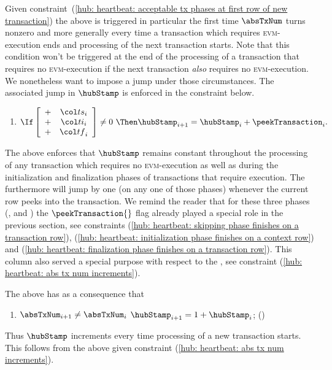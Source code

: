 \saNote{} Given constraint~(\ref{hub: heartbeat: acceptable tx phases at first row of new transaction}) the above is triggered in particular the first time $\absTxNum$ turns nonzero and more generally every time a transaction which requires \textsc{evm}-execution ends and processing of the next transaction starts. Note that this condition won't be triggered at the end of the processing of a transaction that requires no \textsc{evm}-execution if the next transaction \emph{also} requires no \textsc{evm}-execution.
We nonetheless want to impose a jump under those circumstances.
The associated jump in $\hubStamp$ is enforced in the constraint below.
\begin{enumerate}[resume]
	\item
		\[
			\If
			\left[ \begin{array}{cccc}
				+ & \ts_{i} \\
				+ & \ti_{i} \\
				+ & \tf_{i} \\
			\end{array} \right]
			\neq 0
			~ \Then \hubStamp_{i + 1} = \hubStamp_{i} + \peekTransaction_{i}.
		\]
\end{enumerate}
\saNote{}
The above enforces that $\hubStamp$ remains constant throughout the processing of any transaction which requires no \textsc{evm}-execution as well as during the initialization and finalization phases of transactions that require \evm{} execution. The \hubStamp{} furthermore will jump by one (on any one of those phases) whenever the current row peeks into the transaction.
We remind the reader that for these three phases (\txSkip, \txInit{} and \txFinl{}) the $\peekTransaction{}$ flag already played a special role in the previous section, see constraints
(\ref{hub: heartbeat: skipping phase finishes on a transaction row}),
(\ref{hub: heartbeat: initialization phase finishes on a context row}) and
(\ref{hub: heartbeat: finalization phase finishes on a transaction row}).
This column also served a special purpose with respect to the \absTxNum, see constraint (\ref{hub: heartbeat: abs tx num increments}).

The above has as a consequence that
\begin{enumerate}[resume]
	\item \If $\absTxNum_{i + 1} \neq \absTxNum_{i}$ \Then $\hubStamp_{i + 1} = 1 + \hubStamp_{i}$; \quad (\trash)
\end{enumerate}
\saNote{} Thus $\hubStamp$ increments every time processing of a new transaction starts.
This follows from the above given constraint (\ref{hub: heartbeat: abs tx num increments}).

